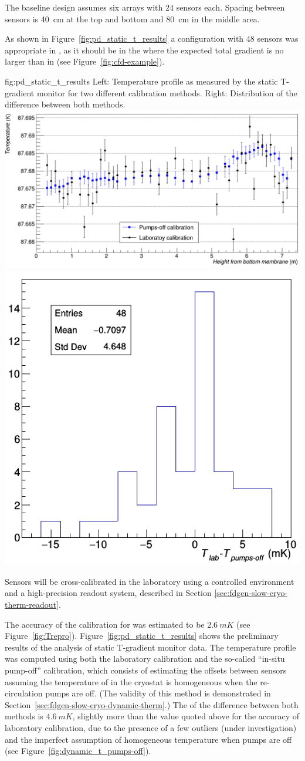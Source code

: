The baseline design assumes six arrays with \num{24} sensors each. 
Spacing between sensors
is \SI{40}{cm} at the top and bottom and \SI{80}{cm} in the middle area.

As shown in Figure~\ref{fig:pd_static_t_results} a configuration with \num{48} sensors was appropriate in , as it should be in the  where the expected total gradient is no larger than in  (see Figure~\ref{fig:cfd-example}). 

\begin{dunefigure}{fig:pd_static_t_results}{
 Left: Temperature profile as measured by the static T-gradient monitor for two different calibration methods. Right: Distribution of the difference between both methods.}
  \includegraphics[height=0.34\textwidth]{graphics/cisc_static_t_profiles.png}%
  \includegraphics[height=0.34\textwidth]{graphics/cisc_static_t_calib_diff.png}%
\end{dunefigure}



Sensors will be cross-calibrated in the laboratory using a controlled environment and a high-precision readout system, described in Section \ref{sec:fdgen-slow-cryo-therm-readout}.

The accuracy of the calibration for  was estimated to be $\SI{2.6}{mK}$ (see Figure~\ref{fig:Trepro}). Figure~\ref{fig:pd_static_t_results} shows the preliminary results of the analysis of  static T-gradient monitor data. The temperature profile was computed using both the laboratory calibration and the so-called ``in-situ pump-off'' calibration, which consists %
of estimating the offsets between sensors assuming the temperature of \lar in the cryostat is homogeneous when the re-circulation pumps are off. (The validity of this method is demonstrated in Section~\ref{sec:fdgen-slow-cryo-dynamic-therm}.)  
The  of the difference between both methods is $\SI{4.6}{mK}$, slightly more than the value quoted above for the accuracy of laboratory calibration, due to the presence of a few outliers (under investigation) and the imperfect assumption of homogeneous temperature when pumps are off (see Figure~\ref{fig:dynamic_t_pumps-off}).  

